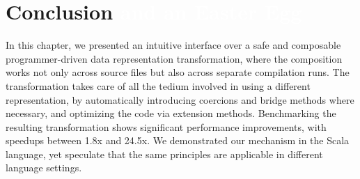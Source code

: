 \section{Conclusion \textcolor{white}{and an Easter Egg}}
\label{ildl:sec:concls}


In this chapter, we presented an intuitive interface over a safe and
composable programmer-driven data representation transformation, where
the composition works not only across source files but also across
separate compilation runs.
The transformation takes care of all the tedium involved in using a
different representation, by automatically introducing coercions and
bridge methods where necessary, and optimizing the code via extension
methods. Benchmarking the resulting transformation shows significant
performance improvements, with speedups between 1.8x and 24.5x. We
demonstrated our mechanism in the Scala language, yet speculate that
the same principles are applicable in different language settings.

